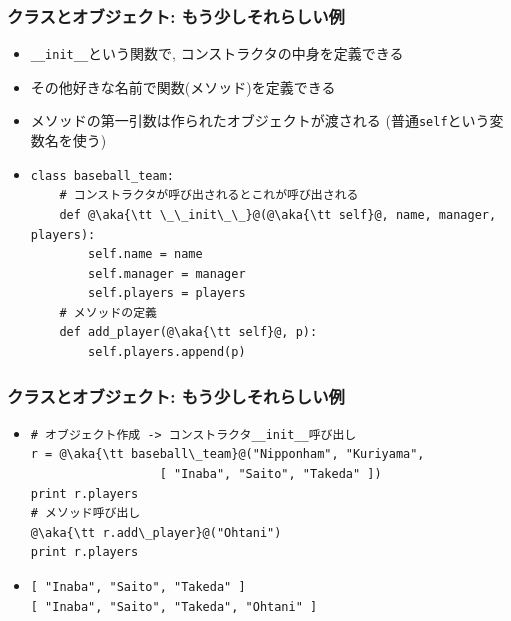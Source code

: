 \documentclass[10pt,dvipdfmx]{beamer}
\newcommand{\aka}[1]{{\color{red}#1}}
\begin{document}
\begin{frame}[fragile]
\frametitle{クラスとオブジェクト: もう少しそれらしい例}

\begin{itemize}
\item \aka{\tt \_\_init\_\_}という関数で,
コンストラクタの中身を定義できる
\item その他好きな名前で関数(\aka{メソッド})を定義できる
\item メソッドの第一引数は作られたオブジェクトが渡される
  (普通\aka{\tt self}という変数名を使う)
\item 
\begin{lstlisting}
class baseball_team:
    # コンストラクタが呼び出されるとこれが呼び出される
    def @\aka{\tt \_\_init\_\_}@(@\aka{\tt self}@, name, manager, players):
        self.name = name
        self.manager = manager
        self.players = players
    # メソッドの定義
    def add_player(@\aka{\tt self}@, p):
        self.players.append(p)
\end{lstlisting}
\end{itemize}
\end{frame}

\begin{frame}[fragile]
\frametitle{クラスとオブジェクト: もう少しそれらしい例}
\begin{itemize}
\item<1-> 
\begin{lstlisting}
# オブジェクト作成 -> コンストラクタ__init__呼び出し
r = @\aka{\tt baseball\_team}@("Nipponham", "Kuriyama", 
                  [ "Inaba", "Saito", "Takeda" ])
print r.players
# メソッド呼び出し
@\aka{\tt r.add\_player}@("Ohtani")
print r.players
\end{lstlisting}

\item<2->
\begin{lstlisting}
[ "Inaba", "Saito", "Takeda" ]
[ "Inaba", "Saito", "Takeda", "Ohtani" ]
\end{lstlisting}
\end{itemize}

\end{frame}
\end{document}
